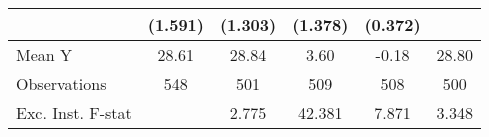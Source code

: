 {\begin{tabular}{l*{5}{c}}
            &     (1.591)         &     (1.303)         &     (1.378)         &     (0.372)         &                     \\
\midrule
Mean Y      &       28.61         &       28.84         &        3.60         &       -0.18         &       28.80         \\
Observations&         548         &         501         &         509         &         508         &         500         \\
Exc. Inst. F-stat&                     &       2.775         &      42.381         &       7.871         &       3.348         \\
\bottomrule
\end{tabular}
}
